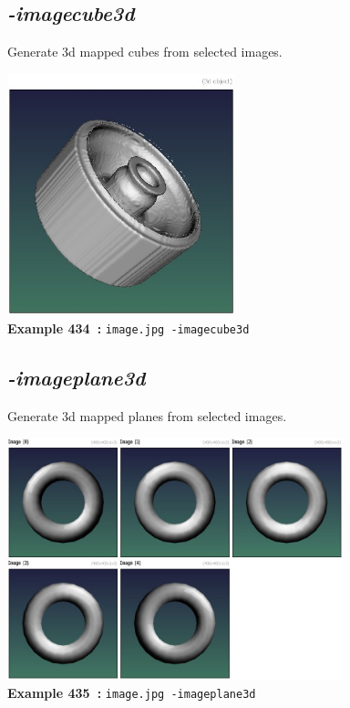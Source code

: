 \documentclass[a4paper,11pt,twoside]{book}
\begin{document}
\subsection{\emph{-imagecube3d} }\vspace*{-0.5em}
Generate 3d mapped cubes from selected images.
\begin{center}\includegraphics[keepaspectratio=true,height=7cm,width=\textwidth]{img/gmic_def434.jpg}\\
{\footnotesize \textbf{Example 434~:} \texttt{image.jpg -imagecube3d}}
\end{center}

\subsection{\emph{-imageplane3d} }\vspace*{-0.5em}
Generate 3d mapped planes from selected images.
\begin{center}\includegraphics[keepaspectratio=true,height=7cm,width=\textwidth]{img/gmic_def435.jpg}\\
{\footnotesize \textbf{Example 435~:} \texttt{image.jpg -imageplane3d}}
\end{center}
\end{document}
